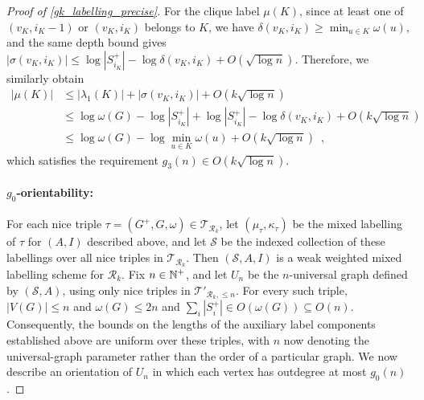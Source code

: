 \documentclass{patmorin}
\renewcommand{\ge}{\geqslant}
\renewcommand{\le}{\leqslant}
\newcommand{\Oh}{O}
\newcommand{\calR}{\mathcal{R}}
\newcommand{\calS}{\mathcal{S}}
\newcommand{\calT}{\mathcal{T}}
\begin{document}
\begin{proof}[Proof of \cref{gk_labelling_precise}]
  For the clique label $\mu(K)$, since at least one of $(v_K,i_K-1)$ or $(v_K,i_K)$ belongs to $K$, we have $\delta(v_K,i_K) \ge \min_{u\in K}\omega(u)$, and the same depth bound gives $|\sigma(v_K,i_K)| \le \log|S^+_{i_K}| - \log\delta(v_K,i_K) + \Oh(\sqrt{\log n})$. Therefore, we similarly obtain
  \begin{align*}
    |\mu(K)|
     & \le |\lambda_1(K)| + |\sigma(v_K,i_K)| + \Oh(k\sqrt{\log n}) \\
     & \le \log\omega(G) - \log|S^+_{i_K}| + \log|S^+_{i_K}| - \log\delta(v_K,i_K) + \Oh(k\sqrt{\log n}) \\
     & \le \log\omega(G) - \log\min_{u\in K}\omega(u) + \Oh(k\sqrt{\log n}) \enspace ,
  \end{align*}
  which satisfies the requirement $g_3(n)\in\Oh(k\sqrt{\log n})$.

  \paragraph{\boldmath $g_0$-orientability:}  
  For each nice triple $\tau=(G^+,G,\omega)\in\calT_{\calR_k}$, let $(\mu_\tau,\kappa_\tau)$ be the mixed labelling of $\tau$ for $(A,I)$ described above, and let $\calS$ be the indexed collection of these labellings over all nice triples in $\calT_{\calR_k}$. Then $(\calS,A,I)$ is a weak weighted mixed labelling scheme for $\calR_k$. Fix $n\in\mathbb{N}^+$, and let $U_n$ be the $n$-universal graph defined by $(\calS,A)$, using only nice triples in $\calT'_{\calR_k,\le n}$. For every such triple, $|V(G)|\le n$ and $\omega(G)\le 2n$ and $\sum_i|S_i^+|\in\Oh(\omega(G))\subseteq\Oh(n)$. Consequently, the bounds on the lengths of the auxiliary label components established above are uniform over these triples, with $n$ now denoting the universal-graph parameter rather than the order of a particular graph. We now describe an orientation of $U_n$ in which each vertex has outdegree at most $g_0(n)$.


\end{proof}
\end{document}
